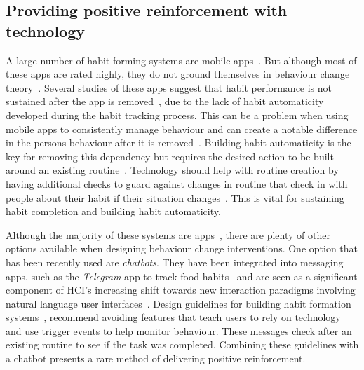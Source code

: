 \documentclass{scaffold/sigchi}
\begin{document}
\subsection{Providing positive reinforcement with technology}
A large number of habit forming systems are mobile apps~\cite{survey_on_current_apps_of_steel}. But although most of these apps are rated highly, they do not ground themselves in behaviour change theory~\cite{article_beyond_self_tracking_designing_apps, article_dont_kick_habit}. Several studies of these apps suggest that habit performance is not sustained after the app is removed~\cite{survey_on_apps_2,article_dont_kick_habit,article_realtime_feedback_improving_medication_taking}, due to the lack of habit automaticity developed during the habit tracking process. This can be a problem when using mobile apps to consistently manage behaviour and can create a notable difference in the persons behaviour after it is removed~\cite{article_my_phone_is_part_of_my_soul}. Building habit automaticity is the key for removing this dependency but requires the desired action to be built around an existing routine~\cite{article_how_habits_formed_modelling_habit_formation, article_implementation_intentions_multicue}. Technology should help with routine creation by having additional checks to guard against changes in routine that check in with people about their habit if their situation changes~\cite{article_dont_forget_your_pill}. This is vital for sustaining habit completion and building habit automaticity.

Although the majority of these systems are apps~\cite{survey_on_current_apps_of_steel}, there are plenty of other options available when designing behaviour change interventions. One option that has been recently used are \textit{chatbots}. They have been integrated into messaging apps, such as the \textit{Telegram} app to track food habits~\cite{telegram_bot_tracking_habits} and are seen as a significant component of HCI's increasing shift towards new interaction paradigms involving natural language user interfaces~\cite{chatbots_and_new_world_of_hci}. Design guidelines for building habit formation systems~\cite{article_beyond_self_tracking_designing_apps}, recommend avoiding features that teach users to rely on technology and use trigger events to help monitor behaviour. These messages check after an existing routine to see if the task was completed. Combining these guidelines with a chatbot presents a rare method of delivering positive reinforcement.
\end{document}
